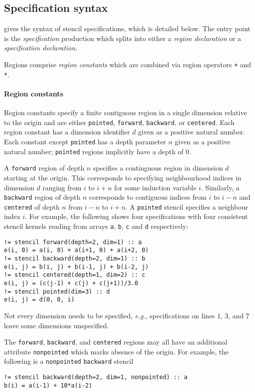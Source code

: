 \documentclass[10pt,preprint]{sigplanconf}
\theoremstyle{definition}
\newcommand{\eg}{\emph{e.g.}}
\newcommand{\nonterm}[1]{\textit{#1}}
\newcommand{\term}[1]{\texttt{#1}}
\begin{document}
\subsection{Specification syntax}
\label{subsec:syntax}

 gives the syntax of stencil specifications, which is
detailed below. The entry point is the \nonterm{specification} production which
splits into either a \emph{region declaration} or a \emph{specification
declaration}.

Regions comprise \emph{region constants} which are
combined via region operators \term{+} and \term{*}.

\paragraph{Region constants}

Region constants specify a finite contiguous region in a
single dimension relative to the origin and are either \term{pointed},
\term{forward}, \term{backward}, or \term{centered}.  Each region
constant has a dimension identifier $d$ given as a positive natural number.
Each constant except \term{pointed} has a depth
parameter $n$ given as a positive natural number; \term{pointed}
regions implicitly have a depth of $0$.

A \term{forward} region of depth $n$ specifies a continguous
region in dimension $d$ starting at the origin. This corresponds
to specifying neighbourhood indices in dimension $d$ ranging from $i$ to $i + n$
for some induction variable $i$. Similarly, a
\term{backward} region of depth $n$ corresponds to contiguous indices
from $i$ to $i - n$ and \term{centered}
of depth $n$ from $i - n$ to $i + n$. A \term{pointed}
stencil specifies a neighbour index $i$. For example, the
following shows four specifications with four consistent stencil
kernels reading from arrays \term{a}, \term{b}, \term{c} and \term{d} respectively:
\begin{verbatim}
!= stencil forward(depth=2, dim=1) :: a
e(i, 0) = a(i, 0) + a(i+1, 0) + a(i+2, 0)
!= stencil backward(depth=2, dim=1) :: b
e(i, j) = b(i, j) + b(i-1, j) + b(i-2, j)
!= stencil centered(depth=1, dim=2) :: c
e(i, j) = (c(j-1) + c(j) + c(j+1))/3.0
!= stencil pointed(dim=3) :: d
e(i, j) = d(0, 0, i)
\end{verbatim}
Not every dimension needs to be specified, \eg{},
specifications on lines $1$, $3$, and $7$ leave some dimensions unspecified.

The \term{forward}, \term{backward}, and \term{centered} regions may
all have an additional attribute \term{nonpointed} which marks absence
of the origin.  For example, the following is a
\term{nonpointed} \term{backward} stencil
%
\begin{verbatim}
!= stencil backward(depth=2, dim=1, nonpointed) :: a
b(i) = a(i-1) + 10*a(i-2)
\end{verbatim}
\end{document}
